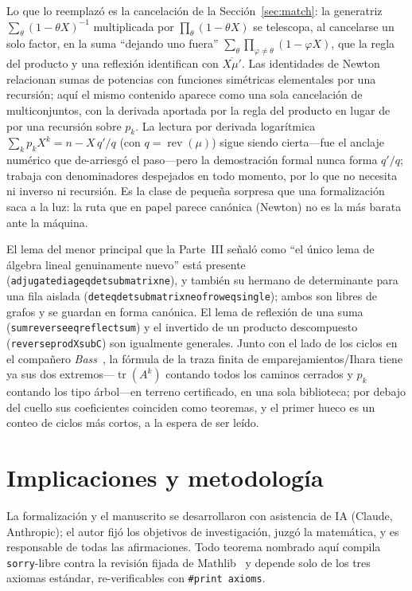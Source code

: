 \documentclass[11pt]{article}
\newcommand{\lean}[1]{{\def\_{\textunderscore\allowbreak}\texttt{#1}}}
\DeclareMathOperator{\tr}{tr}
\DeclareMathOperator{\rev}{rev}
\begin{document}
Lo que lo reemplaz\'o es la cancelaci\'on de la Secci\'on~\ref{sec:match}: la generatriz
$\sum_\theta(1-\theta X)^{-1}$ multiplicada por $\prod_\theta(1-\theta X)$ se telescopa, al cancelarse
un solo factor, en la suma ``dejando uno fuera''
$\sum_\theta\prod_{\varphi\neq\theta}(1-\varphi X)$, que la regla del producto y una reflexi\'on
identifican con $\overline{X\mu'}$. Las identidades de Newton relacionan sumas de potencias con
funciones sim\'etricas elementales por una recursi\'on; aqu\'i el mismo contenido aparece como una sola
cancelaci\'on de multiconjuntos, con la derivada aportada por la regla del producto en lugar de por una
recursi\'on sobre $p_k$. La lectura por derivada logar\'itmica $\sum_kp_kX^k=n-X\,q'/q$ (con
$q=\rev(\mu)$) sigue siendo cierta---fue el anclaje num\'erico que de-arriesg\'o el paso---pero la
demostraci\'on formal nunca forma $q'/q$; trabaja con denominadores despejados en todo momento, por lo
que no necesita ni inverso ni recursi\'on. Es la clase de peque\~na sorpresa que una formalizaci\'on
saca a la luz: la ruta que en papel parece can\'onica (Newton) no es la m\'as barata ante la m\'aquina.

El lema del menor principal que la Parte~III se\~nal\'o como ``el \'unico lema de \'algebra lineal
genuinamente nuevo'' est\'a presente (\lean{adjugate\_diag\_eq\_det\_submatrix\_ne}), y tambi\'en su
hermano de determinante para una fila aislada (\lean{det\_eq\_det\_submatrix\_ne\_of\_row\_eq\_single});
ambos son libres de grafos y se guardan en forma can\'onica. El lema de reflexi\'on de una suma
(\lean{sum\_reverse\_eq\_reflect\_sum}) y el invertido de un producto descompuesto
(\lean{reverse\_prod\_X\_sub\_C}) son igualmente generales. Junto con el lado de los ciclos en el
compa\~nero \emph{Bass}~\cite{Bass}, la f\'ormula de la traza finita de emparejamientos/Ihara tiene ya
sus dos extremos---$\tr(A^k)$ contando todos los caminos cerrados y $p_k$ contando los tipo
\'arbol---en terreno certificado, en una sola biblioteca; por debajo del cuello sus coeficientes
coinciden como teoremas, y el primer hueco es un conteo de ciclos m\'as cortos, a la espera de ser
le\'ido.

\section{Implicaciones y metodolog\'ia}
\label{sec:methodology}

La formalizaci\'on y el manuscrito se desarrollaron con asistencia de IA (Claude, Anthropic); el autor
fij\'o los objetivos de investigaci\'on, juzg\'o la matem\'atica, y es responsable de todas las
afirmaciones. Todo teorema nombrado aqu\'i compila \lean{sorry}-libre contra la revisi\'on fijada de
Mathlib~\cite{Mathlib} y depende solo de los tres axiomas est\'andar, re-verificables con
\lean{\#print axioms}.
\end{document}
